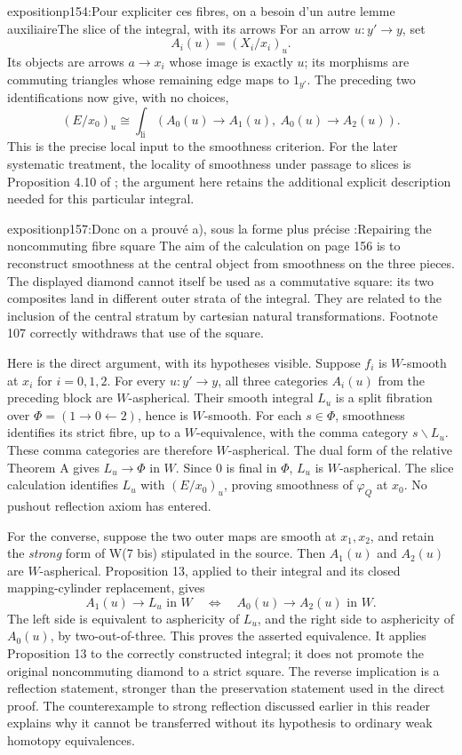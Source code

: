\begin{dcomment}{exposition}{p154:Pour expliciter ces fibres, on a besoin d'un autre lemme auxiliaire}{The slice of the integral, with its arrows}
For an arrow $u:y'\to y$, set
\[
 A_i(u)=(X_i/x_i)_u.
\]
Its objects are arrows $a\to x_i$ whose image is exactly $u$; its morphisms are commuting triangles whose remaining edge maps to $1_{y'}$. The preceding two identifications now give, with no choices,
\[
       (E/x_0)_u\cong\int_{\mathrm{li}}
          (A_0(u)\longrightarrow A_1(u),\ A_0(u)\longrightarrow A_2(u)).
\]
This is the precise local input to the smoothness criterion. For the later systematic treatment, the locality of smoothness under passage to slices is Proposition 4.10 of \citet{Maltsiniotis2005Asphericite}; the argument here retains the additional explicit description needed for this particular integral.
\end{dcomment}

\begin{dcomment}{exposition}{p157:Donc on a prouvé a), sous la forme plus précise :}{Repairing the noncommuting fibre square}
The aim of the calculation on page 156 is to reconstruct smoothness at the central object from smoothness on the three pieces. The displayed diamond cannot itself be used as a commutative square: its two composites land in different outer strata of the integral. They are related to the inclusion of the central stratum by cartesian natural transformations. Footnote 107 correctly withdraws that use of the square.

Here is the direct argument, with its hypotheses visible. Suppose $f_i$ is $W$-smooth at $x_i$ for $i=0,1,2$. For every $u:y'\to y$, all three categories $A_i(u)$ from the preceding block are $W$-aspherical. Their smooth integral $L_u$ is a split fibration over $\Phi=(1\to0\leftarrow2)$, hence is $W$-smooth. For each $s\in\Phi$, smoothness identifies its strict fibre, up to a $W$-equivalence, with the comma category $s\backslash L_u$. These comma categories are therefore $W$-aspherical. The dual form of the relative Theorem A gives $L_u\to\Phi$ in $W$. Since $0$ is final in $\Phi$, $L_u$ is $W$-aspherical. The slice calculation identifies $L_u$ with $(E/x_0)_u$, proving smoothness of $\varphi_Q$ at $x_0$. No pushout reflection axiom has entered.

For the converse, suppose the two outer maps are smooth at $x_1,x_2$, and retain the \emph{strong} form of W(7 bis) stipulated in the source. Then $A_1(u)$ and $A_2(u)$ are $W$-aspherical. Proposition 13, applied to their integral and its closed mapping-cylinder replacement, gives
\[
 A_1(u)\longrightarrow L_u\text{ in }W
 \quad\Longleftrightarrow\quad
 A_0(u)\longrightarrow A_2(u)\text{ in }W.
\]
The left side is equivalent to asphericity of $L_u$, and the right side to asphericity of $A_0(u)$, by two-out-of-three. This proves the asserted equivalence. It applies Proposition 13 to the correctly constructed integral; it does not promote the original noncommuting diamond to a strict square. The reverse implication is a reflection statement, stronger than the preservation statement used in the direct proof. The counterexample to strong reflection discussed earlier in this reader explains why it cannot be transferred without its hypothesis to ordinary weak homotopy equivalences.


\end{dcomment}
